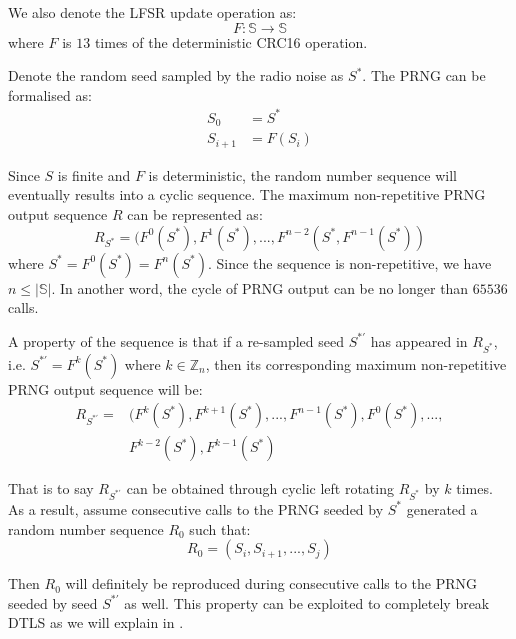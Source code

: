 We also denote the LFSR update operation as:
\begin{equation}
F:\mathbb{S} \rightarrow \mathbb{S}
\end{equation}
where $F$ is $13$ times of the deterministic CRC16 operation.

Denote the random seed sampled by the radio noise as $S^*$. The PRNG can be formalised as:
\begin{equation}
	\begin{aligned}
	S_{0} &= S^* \\
	S_{i+1} &= F(S_{i})
	\end{aligned}
\end{equation}

Since ${S}$ is finite and $F$ is deterministic, the random number sequence will eventually results into a cyclic sequence. The maximum non-repetitive PRNG output sequence $R$ can be represented as:
\begin{equation}
R_{S^*}= (F^0(S^{*}), F^{1}(S^{*}), ..., F^{n-2}(S^{*}, F^{n-1}(S^{*}))
\end{equation}
where $S^{*} = F^{0}(S^{*}) = F^{n}(S^{*})$. Since the sequence is non-repetitive, we have $n \leq |\mathbb{S}|$. In another word, the cycle of PRNG output can be no longer than $65536$ calls.

A property of the sequence is that if a re-sampled seed $S^{*'}$ has appeared in $R_{S^*}$, i.e. $S^{*'} = F^{k}(S^*)$ where $k \in \mathbb{Z}_n$, then its corresponding maximum non-repetitive PRNG output sequence will be:
\begin{equation}
	\begin{aligned}
	R_{S^{*'}} = &( F^{k}(S^*), F^{k+1}(S^{*}), ..., F^{n-1}(S^*), F^{0}(S^*), ...,\\
	&F^{k-2}(S^{*}), F^{k-1}(S^{*})
	\end{aligned}
\end{equation}

That is to say $R_{S^{*'}}$ can be obtained through cyclic left rotating $R_{S^*}$ by $k$ times. As a result, assume consecutive calls to the PRNG seeded by $S^*$ generated a random number sequence $R_0$ such that:
\begin{equation}
R_0 = (S_i, S_{i+1}, ..., S_{j})
\end{equation}

Then $R_0$ will definitely be reproduced during consecutive calls to the PRNG seeded by seed $S^{*'}$ as well. This property can be exploited to completely break DTLS as we will explain in .

